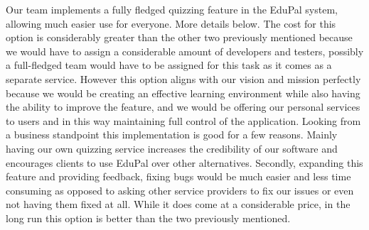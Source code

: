 \documentclass[
    english, %
]{VUMIFPSkursinis}
\begin{document}
Our team implements a fully fledged quizzing feature in the EduPal system, allowing much easier use for everyone. More details below. The cost for this option is considerably greater than the other two previously mentioned because we would have to assign a considerable amount of developers and testers, possibly a full-fledged team would have to be assigned for this task as it comes as a separate service. However this option aligns with our vision and mission perfectly because we would be creating an effective learning environment while also having the ability to improve the feature, and we would be offering our personal services to users and in this way maintaining full control of the application. Looking from a business standpoint this implementation is good for a few reasons. Mainly having our own quizzing service increases the credibility of our software and encourages clients to use EduPal over other alternatives. Secondly, expanding this feature and providing feedback, fixing bugs would be much easier and less time consuming as opposed to asking other service providers to fix our issues or even not having them fixed at all. While it does come at a considerable price, in the long run this option is better than the two previously mentioned.

\listoffigures
\printbibliography[heading=bibintoc]
\end{document}
